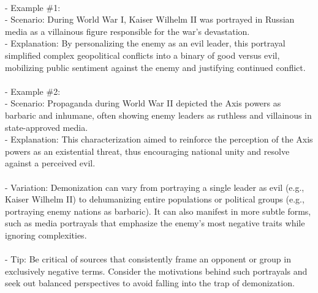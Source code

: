 \documentclass[a4paper,12pt,single,pdftex]{scrbook}
\begin{document}
{    \\

    
      - Example \#1:
    \\

    
        - Scenario: During World War I, Kaiser Wilhelm II was portrayed in Russian media as a villainous figure responsible for the war's devastation.
    \\

    
        - Explanation: By personalizing the enemy as an evil leader, this portrayal simplified complex geopolitical conflicts into a binary of good versus evil, mobilizing public sentiment against the enemy and justifying continued conflict.
    \\

    
      
    \\

    
      - Example \#2:
    \\

    
        - Scenario: Propaganda during World War II depicted the Axis powers as barbaric and inhumane, often showing enemy leaders as ruthless and villainous in state-approved media.
    \\

    
        - Explanation: This characterization aimed to reinforce the perception of the Axis powers as an existential threat, thus encouraging national unity and resolve against a perceived evil.
    \\

    
      
    \\

    
      - Variation: Demonization can vary from portraying a single leader as evil (e.g., Kaiser Wilhelm II) to dehumanizing entire populations or political groups (e.g., portraying enemy nations as barbaric). It can also manifest in more subtle forms, such as media portrayals that emphasize the enemy's most negative traits while ignoring complexities.
    \\

    
      
    \\

    
      - Tip: Be critical of sources that consistently frame an opponent or group in exclusively negative terms. Consider the motivations behind such portrayals and seek out balanced perspectives to avoid falling into the trap of demonization.
    \\

}
\end{document}
